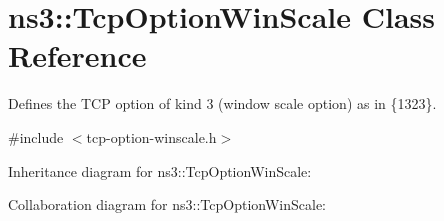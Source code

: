 \hypertarget{classns3_1_1TcpOptionWinScale}{}\section{ns3\+:\+:Tcp\+Option\+Win\+Scale Class Reference}
\label{classns3_1_1TcpOptionWinScale}


Defines the T\+CP option of kind 3 (window scale option) as in \{1323\}.  




{\ttfamily \#include $<$tcp-\/option-\/winscale.\+h$>$}



Inheritance diagram for ns3\+:\+:Tcp\+Option\+Win\+Scale\+:


Collaboration diagram for ns3\+:\+:Tcp\+Option\+Win\+Scale\+:
